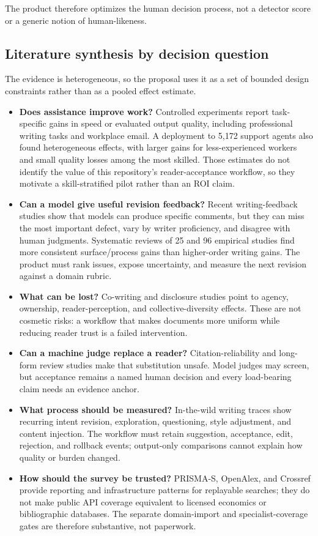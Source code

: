 \documentclass[11pt]{article}
\providecommand{\tightlist}{\setlength{\itemsep}{0pt}\setlength{\parskip}{0pt}}
\begin{document}
The product therefore optimizes the human decision process, not a detector score or a generic notion of human-likeness.

\hypertarget{literature-synthesis-by-decision-question}{%
\subsection{Literature synthesis by decision question}\label{literature-synthesis-by-decision-question}}

The evidence is heterogeneous, so the proposal uses it as a set of bounded design constraints rather than as a pooled effect estimate.

\begin{itemize}
\tightlist
\item
  \textbf{Does assistance improve work?} Controlled experiments report task-specific gains in speed or evaluated output quality, including professional writing tasks and workplace email. A deployment to 5,172 support agents also found heterogeneous effects, with larger gains for less-experienced workers and small quality losses among the most skilled. Those estimates do not identify the value of this repository's reader-acceptance workflow, so they motivate a skill-stratified pilot rather than an ROI claim.
\item
  \textbf{Can a model give useful revision feedback?} Recent writing-feedback studies show that models can produce specific comments, but they can miss the most important defect, vary by writer proficiency, and disagree with human judgments. Systematic reviews of 25 and 96 empirical studies find more consistent surface/process gains than higher-order writing gains. The product must rank issues, expose uncertainty, and measure the next revision against a domain rubric.
\item
  \textbf{What can be lost?} Co-writing and disclosure studies point to agency, ownership, reader-perception, and collective-diversity effects. These are not cosmetic risks: a workflow that makes documents more uniform while reducing reader trust is a failed intervention.
\item
  \textbf{Can a machine judge replace a reader?} Citation-reliability and long-form review studies make that substitution unsafe. Model judges may screen, but acceptance remains a named human decision and every load-bearing claim needs an evidence anchor.
\item
  \textbf{What process should be measured?} In-the-wild writing traces show recurring intent revision, exploration, questioning, style adjustment, and content injection. The workflow must retain suggestion, acceptance, edit, rejection, and rollback events; output-only comparisons cannot explain how quality or burden changed.
\item
  \textbf{How should the survey be trusted?} PRISMA-S, OpenAlex, and Crossref provide reporting and infrastructure patterns for replayable searches; they do not make public API coverage equivalent to licensed economics or bibliographic databases. The separate domain-import and specialist-coverage gates are therefore substantive, not paperwork.
\end{itemize}
\end{document}
